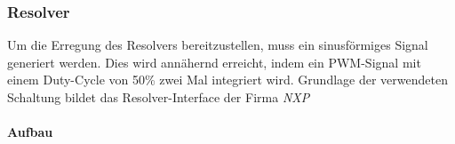 \subsubsection{Resolver}\label{subsubsec:Resolver_Detail}

Um die Erregung des Resolvers bereitzustellen, muss ein sinusförmiges Signal generiert werden. Dies wird annähernd erreicht, indem ein PWM-Signal mit einem Duty-Cycle von 50\% zwei Mal integriert wird. Grundlage der verwendeten Schaltung bildet das Resolver-Interface der Firma \textit{NXP}

\paragraph{Aufbau}\label{par:Aufbau_Detail}\mbox{}\\

